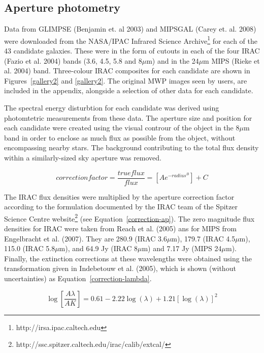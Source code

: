 \documentclass[times,usenatbib]{mn2e}
\begin{document}
\subsection{Aperture photometry}

Data from GLIMPSE (Benjamin et. al 2003) and MIPSGAL (Carey et. al. 2008) were downloaded from the NASA/IPAC Infrared Science Archive\footnote{http://irsa.ipac.caltech.edu} for each of the 43 candidate galaxies. These were in the form of cutouts in each of the four IRAC (Fazio et al. 2004) bands (3.6, 4.5, 5.8 and 8$\mu$m) and in the 24$\mu$m MIPS (Rieke et al. 2004) band. Three-colour IRAC composites for each candidate are shown in Figures~\ref{gallery2} and \ref{gallery2}. The original MWP images seen by users, are included in the appendix, alongside a selection of other data for each candidate.

The spectral energy disturbtion for each candidate was derived using photomtetric measurements from these data. The aperture size and position for each candidate were created using the visual controur of the object in the 8$\mu$m band in order to enclose as much flux as possible from the object, without encompassing nearby stars. The background contributing to the total flux density within a similarly-sized sky aperture was removed.

\begin{equation}
correction factor = \frac{true flux}{flux} = [Ae^{-radius^{B}}] + C
\label{correction-ap}
\end{equation}

The IRAC flux densities were multiplied by the aperture correction factor according to the formulation documented by the IRAC team of the Spitzer Science Centre website\footnote{http://ssc.spitzer.caltech.edu/irac/calib/extcal/} (see Equation~\ref{correction-ap}). The zero magnitude flux densities for IRAC were taken from Reach et al. (2005) ans for MIPS from Engelbracht et al. (2007). They are 280.9 (IRAC 3.6$\mu$m), 179.7 (IRAC 4.5$\mu$m), 115.0 (IRAC 5.8$\mu$m), and 64.9 Jy (IRAC 8$\mu$m) and 7.17 Jy (MIPS 24$\mu$m). Finally, the extinction corrections at these wavelengths were obtained using the transformation given in Indebetouw et al. (2005), which is shown (without uncertainties) as Equation~\ref{correction-lambda}.

\begin{equation}
\log\left [ \frac{A\lambda}{AK}\right ] = 0.61 - 2.22\log(\lambda) + 1.21[\log(\lambda)]^{2}
\label{correction-lambda}
\end{equation}
\end{document}
